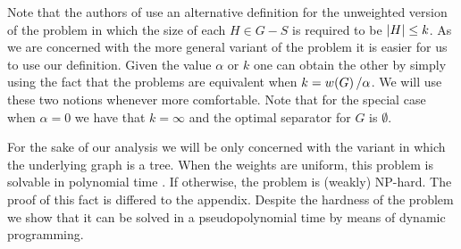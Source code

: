 Note that the authors of \cite{kseparator} use an alternative definition for the unweighted version of the problem in which the size of each $H\in G-S$ is required to be $\mathopen{}\left| H \right|\leq k$. As we are concerned with the more general variant of the problem it is easier for us to use our definition. Given the value $\alpha$ or $k$ one can obtain the other by simply using the fact that the problems are equivalent when $k=w\mathopen{}\left( G \right)/\alpha$. We will use these two notions whenever more comfortable. Note that for the special case when $\alpha=0$ we have that $k=\infty$ and the optimal separator for $G$ is $\emptyset$.

For the sake of our analysis we will be only concerned with the variant in which the underlying graph is a tree. When the weights are uniform, this problem is solvable in polynomial time \cite{kseparator}. 
If otherwise, the problem is (weakly) NP-hard. The proof of this fact is differed to the appendix. Despite the hardness of the problem we show that it can be solved in a pseudopolynomial time by means of dynamic programming.


